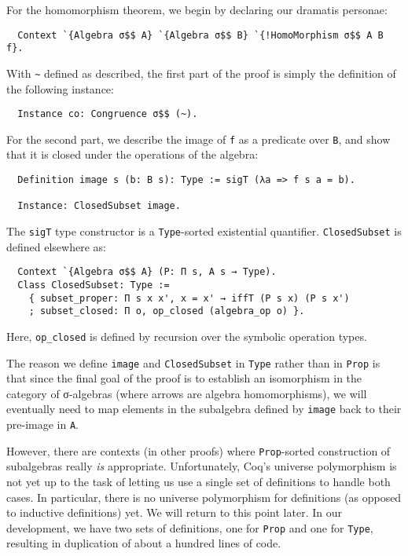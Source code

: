 \documentclass[a4paper,10pt,runningheads]{llncs}
\begin{document}
For the homomorphism theorem, we begin by declaring our dramatis personae:
\begin{lstlisting}
  Context `{Algebra σ$$ A} `{Algebra σ$$ B} `{!HomoMorphism σ$$ A B f}.
\end{lstlisting}
With \lstinline|~| defined as described, the first part of the proof is simply the definition of the following instance:
\begin{lstlisting}
  Instance co: Congruence σ$$ (~).
\end{lstlisting}

For the second part, we describe the image of \lstinline|f| as a predicate over \lstinline|B|, and show that it is closed under the operations of the algebra: 
\begin{lstlisting}
  Definition image s (b: B s): Type := sigT (λa => f s a = b).

  Instance: ClosedSubset image.
\end{lstlisting}
The \lstinline|sigT| type constructor is a \lstinline|Type|-sorted existential quantifier. \lstinline|ClosedSubset| is defined elsewhere as:
\begin{lstlisting}
  Context `{Algebra σ$$ A} (P: Π s, A s → Type).
  Class ClosedSubset: Type :=
    { subset_proper: Π s x x', x = x' → iffT (P s x) (P s x')
    ; subset_closed: Π o, op_closed (algebra_op o) }.
\end{lstlisting}
Here, \lstinline|op_closed| is defined by recursion over the symbolic operation types.

The reason we define \lstinline|image| and \lstinline|ClosedSubset| in \lstinline|Type| rather than in \lstinline|Prop| is that since the final goal of the proof is to establish an isomorphism in the category of σ-algebras (where arrows are algebra homomorphisms), we will eventually need to map elements in the subalgebra defined by \lstinline|image| back to their pre-image in \lstinline|A|.

However, there are contexts (in other proofs) where \lstinline|Prop|-sorted construction of subalgebras really \emph{is} appropriate. Unfortunately, Coq's universe polymorphism is not yet up to the task of letting us use a single set of definitions to handle both cases. In particular, there is no universe polymorphism for definitions (as opposed to inductive definitions) yet. We will return to this point later. In our development, we have two sets of definitions, one for \lstinline|Prop| and one for \lstinline|Type|, resulting in duplication of about a hundred lines of code.
\end{document}
